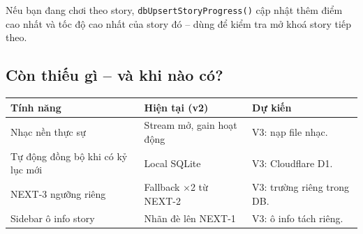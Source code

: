 \documentclass[12pt,a4paper]{article}
\begin{document}
\vspace{4pt}
\noindent Nếu bạn đang chơi theo story, \texttt{dbUpsertStoryProgress()}
cập nhật thêm điểm cao nhất và tốc độ cao nhất của story đó -- dùng
để kiểm tra mở khoá story tiếp theo.

\subsection{Còn thiếu gì -- và khi nào có?}

\vspace{4pt}
\begin{tabularx}{\linewidth}{|l|l|X|}
    \hline
    \textbf{Tính năng}             & \textbf{Hiện tại (v2)}        & \textbf{Dự kiến} \\
    \hline
    Nhạc nền thực sự               & Stream mở, gain hoạt động     & V3: nạp file nhạc. \\
    \hline
    Tự động đồng bộ khi có kỷ lục mới       & Local SQLite                  & V3: Cloudflare D1. \\
    \hline
    NEXT-3 ngưỡng riêng            & Fallback $\times$2 từ NEXT-2  & V3: trường riêng trong DB. \\
    \hline
    Sidebar ô info story           & Nhãn đè lên NEXT-1            & V3: ô info tách riêng. \\
    \hline
\end{tabularx}

\label{LastPageGameCoreGuide}
\end{document}
